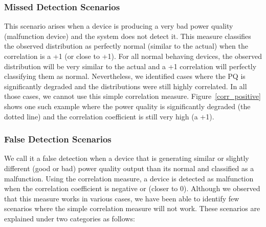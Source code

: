 \subsubsection{Missed Detection Scenarios}
This scenario arises when a device is producing a very bad power quality (malfunction device) and the system does not detect it. This measure classifies the observed distribution as perfectly normal (similar to the actual) when the correlation is a +1 (or close to +1). For all normal behaving devices, the observed distribution will be very similar to the actual and a +1 correlation will perfectly classifying them as normal. Nevertheless, we identified cases where the PQ is significantly degraded and the distributions were still highly correlated. In all those cases, we cannot use this simple correlation measure. Figure~\ref{corr_positive} shows one such example where the power quality is significantly degraded (the dotted line) and the correlation coefficient is still very high (a +1).

\subsubsection{False Detection Scenarios}
We call it a false detection when a device that is generating similar or slightly different (good or bad) power quality output than its normal and classified as a malfunction. Using the correlation measure, a device is detected as malfunction when the correlation coefficient is negative or (closer to 0). Although we observed that this measure works in various cases, we have been able to identify few scenarios where the simple correlation measure will not work. These scenarios are explained under two categories as follows:

